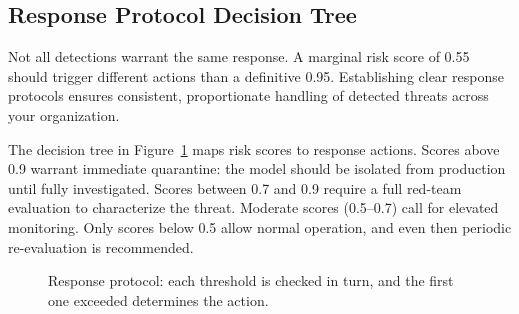 \documentclass[11pt,letterpaper]{article}
\let\origsubsection\subsection
\renewcommand{\subsection}{\needspace{8\baselineskip}\origsubsection}}
\begin{document}
\subsection{Response Protocol Decision Tree}

Not all detections warrant the same response. A marginal risk score of 0.55 should trigger different actions than a definitive 0.95. Establishing clear response protocols ensures consistent, proportionate handling of detected threats across your organization.

The decision tree in Figure~\ref{fig:response-tree} maps risk scores to response actions. Scores above 0.9 warrant immediate quarantine: the model should be isolated from production until fully investigated. Scores between 0.7 and 0.9 require a full red-team evaluation to characterize the threat. Moderate scores (0.5--0.7) call for elevated monitoring. Only scores below 0.5 allow normal operation, and even then periodic re-evaluation is recommended.

\begin{figure}[!htbp]
\centering
{}
\caption{Response protocol: each threshold is checked in turn, and the first one exceeded determines the action.}
\label{fig:response-tree}
\end{figure}
\end{document}
